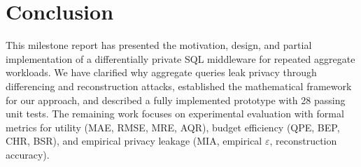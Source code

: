 \documentclass[sigconf,nonacm]{acmart}
\begin{document}
\section{Conclusion}

This milestone report has presented the motivation, design, and partial implementation of a differentially private SQL middleware for repeated aggregate workloads. We have clarified why aggregate queries leak privacy through differencing and reconstruction attacks, established the mathematical framework for our approach, and described a fully implemented prototype with 28 passing unit tests. The remaining work focuses on experimental evaluation with formal metrics for utility (MAE, RMSE, MRE, AQR), budget efficiency (QPE, BEP, CHR, BSR), and empirical privacy leakage (MIA, empirical $\varepsilon$, reconstruction accuracy).
\end{document}
